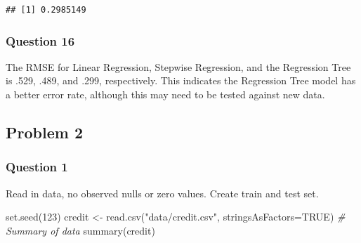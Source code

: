 \documentclass[]{article}
\newenvironment{Shaded}{\begin{snugshade}}{\end{snugshade}}
\newcommand{\AttributeTok}[1]{\textcolor[rgb]{0.77,0.63,0.00}{#1}}
\newcommand{\CommentTok}[1]{\textcolor[rgb]{0.56,0.35,0.01}{\textit{#1}}}
\newcommand{\ConstantTok}[1]{\textcolor[rgb]{0.00,0.00,0.00}{#1}}
\newcommand{\DecValTok}[1]{\textcolor[rgb]{0.00,0.00,0.81}{#1}}
\newcommand{\FunctionTok}[1]{\textcolor[rgb]{0.00,0.00,0.00}{#1}}
\newcommand{\NormalTok}[1]{#1}
\newcommand{\OtherTok}[1]{\textcolor[rgb]{0.56,0.35,0.01}{#1}}
\newcommand{\SpecialCharTok}[1]{\textcolor[rgb]{0.00,0.00,0.00}{#1}}
\newcommand{\StringTok}[1]{\textcolor[rgb]{0.31,0.60,0.02}{#1}}
\begin{document}
\begin{Shaded}
\end{Shaded}

\begin{verbatim}
## [1] 0.2985149
\end{verbatim}

\hypertarget{question-16}{%
\subsubsection{Question 16}\label{question-16}}

The RMSE for Linear Regression, Stepwise Regression, and the Regression
Tree is .529, .489, and .299, respectively. This indicates the
Regression Tree model has a better error rate, although this may need to
be tested against new data.

\hypertarget{problem-2}{%
\subsection{Problem 2}\label{problem-2}}

\hypertarget{question-1-1}{%
\subsubsection{Question 1}\label{question-1-1}}

Read in data, no observed nulls or zero values. Create train and test
set.

\begin{Shaded}
\begin{Highlighting}[]
\FunctionTok{set.seed}\NormalTok{(}\DecValTok{123}\NormalTok{)}
\NormalTok{credit }\OtherTok{\textless{}{-}} \FunctionTok{read.csv}\NormalTok{(}\StringTok{"data/credit.csv"}\NormalTok{, }\AttributeTok{stringsAsFactors=}\ConstantTok{TRUE}\NormalTok{)}
\CommentTok{\# Summary of data}
\FunctionTok{summary}\NormalTok{(credit)}
\end{Highlighting}
\end{Shaded}
\end{document}
